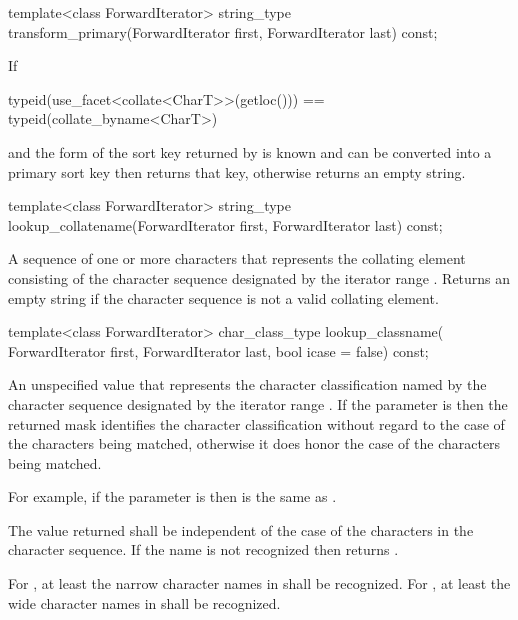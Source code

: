 %
\begin{itemdecl}
template<class ForwardIterator>
  string_type transform_primary(ForwardIterator first, ForwardIterator last) const;
\end{itemdecl}

\begin{itemdescr}
\pnum
\effects
If
\begin{codeblock}
typeid(use_facet<collate<CharT>>(getloc())) == typeid(collate_byname<CharT>)
\end{codeblock}
and the form of the sort key returned
by  is known and
can be converted into a primary sort key then returns that key,
otherwise returns an empty string.
\end{itemdescr}

%
\begin{itemdecl}
template<class ForwardIterator>
  string_type lookup_collatename(ForwardIterator first, ForwardIterator last) const;
\end{itemdecl}

\begin{itemdescr}
\pnum
\returns
A sequence of one or more characters that
represents the collating element consisting of the character
sequence designated by the iterator range .
Returns an empty string if the character sequence is not a
valid collating element.
\end{itemdescr}

%
\begin{itemdecl}
template<class ForwardIterator>
  char_class_type lookup_classname(
    ForwardIterator first, ForwardIterator last, bool icase = false) const;
\end{itemdecl}

\begin{itemdescr}
\pnum
\returns
An unspecified value that represents
the character classification named by the character sequence
designated by the iterator range .
If the parameter  is  then the returned mask identifies the
character classification without regard to the case of the characters being
matched, otherwise it does honor the case of the characters being
matched.
\begin{footnote}
For example, if the parameter  is  then
\tcode{[[:lower:]]} is the same as \tcode{[[:alpha:]]}.
\end{footnote}
The value
returned shall be independent of the case of the characters in
the character sequence. If the name
is not recognized then returns .

\pnum
\remarks
For , at least the narrow character names
in  shall be recognized.
For , at least the wide character names
in  shall be recognized.
\end{itemdescr}

